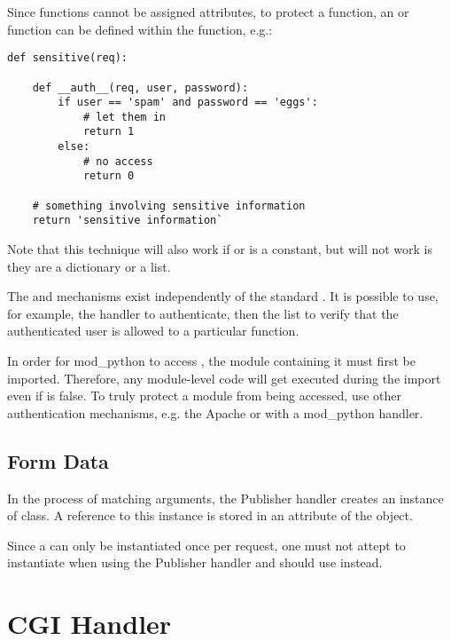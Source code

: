 Since functions cannot be assigned attributes, to protect a function,
an  or  function can be defined within
the function, e.g.:

\begin{verbatim}
def sensitive(req):

    def __auth__(req, user, password):
        if user == 'spam' and password == 'eggs':
            # let them in
            return 1
        else:
            # no access
            return 0

    # something involving sensitive information
    return 'sensitive information`
\end{verbatim}

Note that this technique will also work if  or
 is a constant, but will not work is they are
a dictionary or a list. 

The  and  mechanisms exist
independently of the standard 
. It
is possible to use, for example, the handler to authenticate, then the
 list to verify that the authenticated user is
allowed to a particular function. 

 In order for mod_python to access ,
the module containing it must first be imported. Therefore, any
module-level code will get executed during the import even if
 is false.  To truly protect a module from
being accessed, use other authentication mechanisms, e.g. the Apache
 or with a mod_python  handler.

\subsection{Form Data}

In the process of matching arguments, the Publisher handler creates an
instance of 
class. A reference to this instance is stored in an attribute 
of the  object.

Since a  can only be instantiated once per
request, one must not attept to instantiate  when
using the Publisher handler and should use
 instead.

\section{CGI Handler\label{hand-cgi}}

